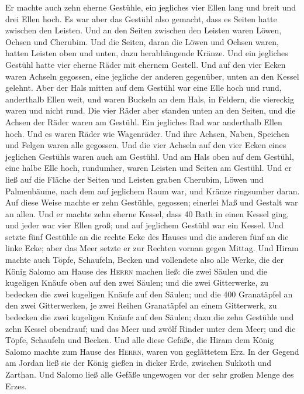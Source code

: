  Er machte auch zehn eherne Gestühle, ein jegliches vier
Ellen lang und breit und drei Ellen hoch.  Es war aber
das Gestühl also gemacht, dass es Seiten hatte zwischen den Leisten.
 Und an den Seiten zwischen den Leisten waren Löwen,
Ochsen und Cherubim. Und die Seiten, daran die Löwen und Ochsen waren,
hatten Leisten oben und unten, dazu herabhängende Kränze.
 Und ein jegliches Gestühl hatte vier eherne Räder mit
ehernem Gestell. Und auf den vier Ecken waren Achseln gegossen, eine
jegliche der anderen gegenüber, unten an den Kessel gelehnt.
 Aber der Hals mitten auf dem Gestühl war eine Elle hoch
und rund, anderthalb Ellen weit, und waren Buckeln an dem Hals, in
Feldern, die viereckig waren und nicht rund.  Die vier
Räder aber standen unten an den Seiten, und die Achsen der Räder waren
am Gestühl. Ein jegliches Rad war anderthalb Ellen hoch. 
Und es waren Räder wie Wagenräder. Und ihre Achsen, Naben, Speichen und
Felgen waren alle gegossen.  Und die vier Achseln auf den
vier Ecken eines jeglichen Gestühls waren auch am Gestühl.
 Und am Hals oben auf dem Gestühl, eine halbe Elle hoch,
rundumher, waren Leisten und Seiten am Gestühl.  Und er
ließ auf die Fläche der Seiten und Leisten graben Cherubim, Löwen und
Palmenbäume, nach dem auf jeglichem Raum war, und Kränze ringsumher
daran.  Auf diese Weise machte er zehn Gestühle,
gegossen; einerlei Maß und Gestalt war an allen.  Und er
machte zehn eherne Kessel, dass 40 Bath in einen Kessel ging, und jeder
war vier Ellen groß; und auf jeglichem Gestühl war ein Kessel.
 Und setzte fünf Gestühle an die rechte Ecke des Hauses
und die anderen fünf an die linke Ecke; aber das Meer setzte er zur
Rechten vornan gegen Mittag.  Und Hiram machte auch
Töpfe, Schaufeln, Becken und vollendete also alle Werke, die der König
Salomo am Hause des \textsc{Herrn} machen ließ:  die zwei
Säulen und die kugeligen Knäufe oben auf den zwei Säulen; und die zwei
Gitterwerke, zu bedecken die zwei kugeligen Knäufe auf den Säulen;
 und die 400 Granatäpfel an den zwei Gitterwerken, je
zwei Reihen Granatäpfel an einem Gitterwerk, zu bedecken die zwei
kugeligen Knäufe auf den Säulen;  dazu die zehn Gestühle
und zehn Kessel obendrauf;  und das Meer und zwölf Rinder
unter dem Meer;  und die Töpfe, Schaufeln und Becken. Und
alle diese Gefäße, die Hiram dem König Salomo machte zum Hause des
\textsc{Herrn}, waren von geglättetem Erz.  In der Gegend
am Jordan ließ sie der König gießen in dicker Erde, zwischen Sukkoth und
Zarthan.  Und Salomo ließ alle Gefäße ungewogen vor der
sehr großen Menge des Erzes.

